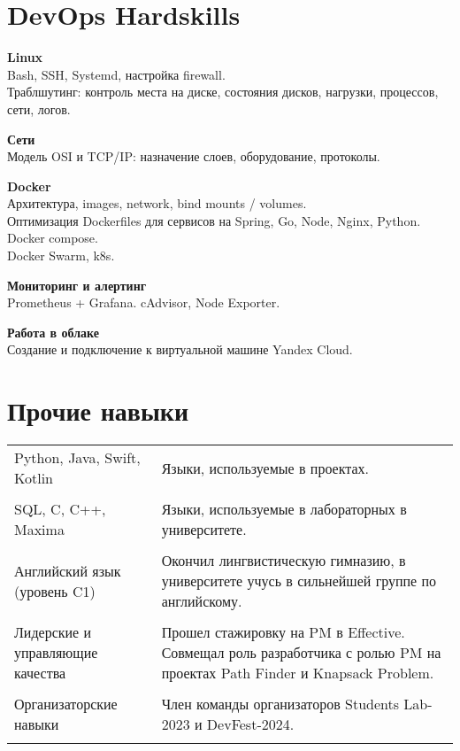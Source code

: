 \documentclass[a4paper,12pt]{article}
\begin{document}
\section{DevOps Hardskills}

\textbf{Linux}\\
Bash, SSH, Systemd, настройка firewall.\\
Траблшутинг: контроль места на диске, состояния дисков, нагрузки, процессов, сети, логов.

\textbf{Сети} \\
Модель OSI и TCP/IP: назначение слоев, оборудование, протоколы.

\textbf{Docker} \\
Архитектура, images, network, bind mounts / volumes. \\
Оптимизация Dockerfiles для сервисов на Spring, Go, Node, Nginx, Python.\\
Docker compose. \\
Docker Swarm, k8s.

\textbf{Мониторинг и алертинг}\\
Prometheus + Grafana. cAdvisor, Node Exporter.

\textbf{Работа в облаке}\\
Создание и подключение к виртуальной машине Yandex Cloud.\\

\section{Прочие навыки}

\begin{tabularx}{\linewidth}{@{}l X@{}}
Python, Java, Swift, Kotlin &  \normalsize{Языки, используемые в проектах.}\\\\

SQL, C, C++, Maxima &  \normalsize{Языки, используемые в лабораторных в университете.}\\\\

Английский язык (уровень C1) &  \normalsize{Окончил лингвистическую гимназию, в университете учусь в сильнейшей группе по английскому.}\\\\

Лидерские и управляющие качества  &  \normalsize {Прошел стажировку на PM в Effective. Совмещал роль разработчика с ролью PM на проектах Path Finder и Knapsack Problem.}\\ \\

Организаторские навыки  &  \normalsize {Член команды организаторов Students Lab-2023 и DevFest-2024.}\\ \\

\end{tabularx}

\vfill
{}
\end{document}
